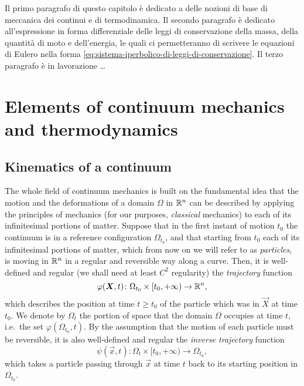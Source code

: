 Il primo paragrafo di questo capitolo è dedicato a delle nozioni di base
di meccanica dei continui e di termodinamica.
Il secondo paragrafo è dedicato all'espressione in forma differenziale
delle leggi di conservazione della massa, della quantità di moto e
dell'energia, le quali ci permetteranno di scrivere le equazioni di Eulero
nella forma \eqref{eq:sistema-iperbolico-di-leggi-di-conservazione}.
Il terzo paragrafo è in lavorazione \dots

\section{Elements of continuum mechanics and thermodynamics}

\subsection*{Kinematics of a continuum}

The whole field of continuum mechanics is built on the fundamental idea that
the motion and the deformations of a domain $\Omega$ in $\mathbb{R}^n$
can be described by applying the principles of mechanics (for our purposes,
\emph{classical} mechanics) to each of its infinitesimal portions of matter.
Suppose that in the first instant of motion $t_0$ the continuum is
in a reference configuration $\Omega_{t_0}$, and that starting from
$t_0$ each of its infinitesimal portions of matter, which from
now on we will refer to as \emph{particles}, is moving in $\mathbb{R}^n$
in a regular and reversible way along a curve. Then, it is well-defined
and regular (we shall need at least $C^2$ regularity)
the \emph{trajectory} function
\[
\varphi(\bm{X},t) \colon \Omega_{t_0} \times [t_0,+\infty) \to \mathbb{R}^n,
\]
which describes the position at time $t \geq t_0$ of the particle which
was in $\vec{X}$ at time $t_0$. We denote by $\Omega_t$ the portion
of space that the domain $\Omega$ occupies at time $t$,
i.e.\ the set $\varphi(\Omega_{t_0},t)$.
By the assumption that the motion of each particle must be reversible,
it is also well-defined and regular the \emph{inverse trajectory} function
\[
\psi(\vec{x},t) \colon \Omega_t \times [t_0,+\infty) \to \Omega_{t_0},
\]
which takes a particle passing through $\vec{x}$ at time $t$ back
to its starting position in $\Omega_{t_0}$.

